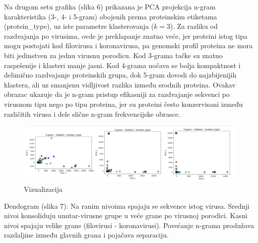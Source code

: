 \documentclass[a4paper,12pt]{article}
\begin{document}
\noindent
\begin{minipage}{\textwidth}
Na drugom setu grafika (slika 6) prikazana je PCA projekcija n-gram karakteristika (3-, 4- i 5-gram) obojenih prema proteinskim etiketama (protein\_type), uz iste parametre klasterovanja ($k=3$). Za razliku od razdvajanja po virusima, ovde je preklapanje znatno veće, jer proteini istog tipa mogu postojati kod filovirusa i koronavirusa, pa genomski profil proteina ne mora biti jedinstven za jednu virusnu porodicu. Kod 3-grama tačke su znatno raspršenije i klasteri manje jasni. Kod 4-grama uočava se bolja kompaktnost i delimično razdvajanje proteinskih grupa, dok 5-gram dovodi do najzbijenijih klastera, ali uz smanjenu vidljivost razlika između srodnih proteina. Ovakav obrazac ukazuje da je n-gram pristup efikasniji za razdvajanje sekvenci po virusnom tipu nego po tipu proteina, jer su proteini često konzervisani između različitih virusa i dele slične n-gram frekvencijske obrasce.
\end{minipage}

\begin{figure}[h!]
    \centering
    \includegraphics[width=1.2\textwidth]{images/hcproteinaa.png}
    \caption{Vizualizacija}
    \label{fig:hc_protein}
\end{figure}

\noindent
\begin{minipage}{\textwidth}
Dendogram (slika 7): Na ranim nivoima spajaju se sekvence istog virusa.
Srednji nivoi konsoliduju unutar-virusne grupe u veće grane po virusnoj porodici.
Kasni nivoi spajaju velike grane (filovirusi - koronavirusi).
Povećanje n-grama produžava razdaljine između glavnih grana i pojačava separaciju.
\end{minipage}
\end{document}
